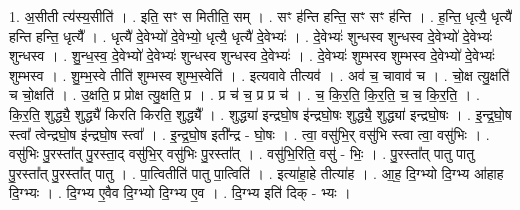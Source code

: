\documentclass[17pt]{extarticle}
\begin{document}
1. अ॒सीती त्य॑स्य॒सीति॑ । . इति॒ सꣳ स मितीति॒ सम् । . सꣳ ह॑न्ति हन्ति॒ सꣳ सꣳ ह॑न्ति । . ह॒न्ति॒ धृत्यै॒ धृत्यै॑ हन्ति हन्ति॒ धृत्यै᳚ । . धृत्यै॑ दे॒वेभ्यो॑ दे॒वेभ्यो॒ धृत्यै॒ धृत्यै॑ दे॒वेभ्यः॑ । . दे॒वेभ्यः॑ शुन्धस्व शुन्धस्व दे॒वेभ्यो॑ दे॒वेभ्यः॑ शुन्धस्व । . शु॒न्ध॒स्व॒ दे॒वेभ्यो॑ दे॒वेभ्यः॑ शुन्धस्व शुन्धस्व दे॒वेभ्यः॑ । . दे॒वेभ्यः॑ शुम्भस्व शुम्भस्व दे॒वेभ्यो॑ दे॒वेभ्यः॑ शुम्भस्व । . शु॒म्भ॒स्वे तीति॑ शुम्भस्व शुम्भ॒स्वेति॑ । . इत्यवावे तीत्यव॑ । . अव॑ च॒ चावाव॑ च । . चो॒क्ष त्यु॒क्षति॑ च चो॒क्षति॑ । . उ॒क्षति॒ प्र प्रोक्ष त्यु॒क्षति॒ प्र । . प्र च॑ च॒ प्र प्र च॑ । . च॒ कि॒र॒ति॒ कि॒र॒ति॒ च॒ च॒ कि॒र॒ति॒ । . कि॒र॒ति॒ शुद्ध्यै॒ शुद्ध्यै॑ किरति किरति॒ शुद्ध्यै᳚ । . शुद्ध्या॑ इन्द्रघो॒ष इ॑न्द्रघो॒षः शुद्ध्यै॒ शुद्ध्या॑ इन्द्रघो॒षः । . इ॒न्द्र॒घो॒ष स्त्वा᳚ त्वेन्द्रघो॒ष इ॑न्द्रघो॒ष स्त्वा᳚ । . इ॒न्द्र॒घो॒ष इती᳚न्द्र - घो॒षः । . त्वा॒ वसु॑भि॒र् वसु॑भि स्त्वा त्वा॒ वसु॑भिः । . वसु॑भिः पु॒रस्ता᳚त् पु॒रस्ता॒द् वसु॑भि॒र् वसु॑भिः पु॒रस्ता᳚त् । . वसु॑भि॒रिति॒ वसु॑ - भिः॒ । . पु॒रस्ता᳚त् पातु पातु पु॒रस्ता᳚त् पु॒रस्ता᳚त् पातु । . पा॒त्वितीति॑ पातु पा॒त्विति॑ । . इत्या॑हा॒हे तीत्या॑ह । . आ॒ह॒ दि॒ग्भ्यो दि॒ग्भ्य आ॑हाह दि॒ग्भ्यः । . दि॒ग्भ्य ए॒वैव दि॒ग्भ्यो दि॒ग्भ्य ए॒व । . दि॒ग्भ्य इति॑ दिक् - भ्यः । \newline
\end{document}
